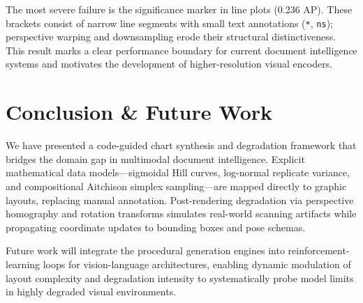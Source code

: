\documentclass[11pt,twocolumn]{article}
\begin{document}
The most severe failure is the significance marker in line plots (0.236 AP). These brackets consist of narrow line segments with small text annotations (\texttt{*}, \texttt{ns}); perspective warping and downsampling erode their structural distinctiveness. This result marks a clear performance boundary for current document intelligence systems and motivates the development of higher-resolution visual encoders.

\section{Conclusion \& Future Work}\label{sec:conclusion}

We have presented a code-guided chart synthesis and degradation framework that bridges the domain gap in multimodal document intelligence.
Explicit mathematical data models---sigmoidal Hill curves, log-normal replicate variance, and compositional Aitchison simplex sampling---are mapped directly to graphic layouts, replacing manual annotation.
Post-rendering degradation via perspective homography and rotation transforms simulates real-world scanning artifacts while propagating coordinate updates to bounding boxes and pose schemas.

Future work will integrate the procedural generation engines into reinforcement-learning loops for vision-language architectures, enabling dynamic modulation of layout complexity and degradation intensity to systematically probe model limits in highly degraded visual environments.
\end{document}
